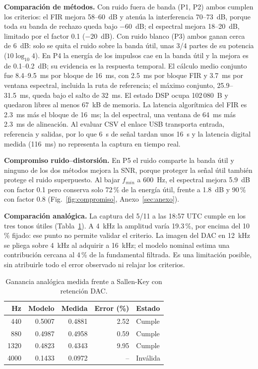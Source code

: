 \documentclass[conference]{IEEEtran}
\begin{document}
\textbf{Comparación de métodos.} Con ruido fuera de banda (P1, P2) ambos cumplen los
criterios: el FIR mejora 58--60~dB y atenúa la interferencia 70--73~dB, porque toda su
banda de rechazo queda bajo $-60$~dB; el espectral mejora 18--20~dB, limitado por el
factor 0.1 ($-20$~dB). Con ruido blanco (P3) ambos ganan cerca de 6~dB: solo se quita el
ruido sobre la banda útil, unas 3/4 partes de su potencia ($10\log_{10}4$). En P4 la
energía de los impulsos cae en la banda útil y la mejora es de 0.1--0.2~dB; su evidencia
es la respuesta temporal. El cálculo medio conjunto fue 8.4--9.5~ms por bloque de
16~ms, con 2.5~ms por bloque FIR y 3.7~ms por ventana espectral, incluida la ruta de
referencia; el máximo conjunto, 25.9--31.5~ms, queda bajo el salto de 32~ms. El estado
DSP ocupa 102\,080~B y quedaron libres al menos 67~kB de memoria. La latencia
algorítmica del FIR es 2.3~ms más el bloque de 16~ms; la del espectral, una ventana de
64~ms más 2.3~ms de alineación. Al evaluar CSV el enlace USB transporta entrada,
referencia y salidas, por lo que 6~s de señal tardan unos 16~s y la latencia digital
medida (116~ms) no representa la captura en tiempo real.

\textbf{Compromiso ruido--distorsión.} En P5 el ruido comparte la banda útil y
ninguno de los dos métodos mejora la SNR, porque proteger la señal útil también protege
el ruido superpuesto. Al bajar $f_{min}$ a 600~Hz, el espectral mejora 5.9~dB con factor
0.1 pero conserva solo 72\,\% de la energía útil, frente a 1.8~dB y 90\,\% con factor 0.8
(Fig.~\ref{fig:compromiso}, Anexo~\ref{sec:anexo}).


\textbf{Comparación analógica.} La captura del 5/11 a las 18:57 UTC cumple en los tres
tonos útiles (Tabla~\ref{tab:analogica}). A 4~kHz la amplitud varía 19.3\,\%, por encima
del 10\,\% fijado: ese punto no permite validar el criterio. La imagen del
DAC en 12~kHz se pliega sobre 4~kHz al adquirir a 16~kHz; el modelo nominal estima una
contribución cercana al 4\,\% de la fundamental filtrada. Es una limitación posible,
sin atribuirle todo el error observado ni relajar los criterios.
\begin{table}[H]\centering\footnotesize
\caption{Ganancia analógica medida frente a Sallen-Key con retención DAC.}
\label{tab:analogica}
\begin{tabular}{rrrrl}\toprule
Hz & Modelo & Medida & Error (\%) & Estado \\\midrule
440 & 0.5007 & 0.4881 & 2.52 & Cumple \\
880 & 0.4987 & 0.4958 & 0.59 & Cumple \\
1320 & 0.4823 & 0.4343 & 9.95 & Cumple \\
4000 & 0.1433 & 0.0972 & -- & Inválida \\\bottomrule
\end{tabular}\end{table}
\end{document}
